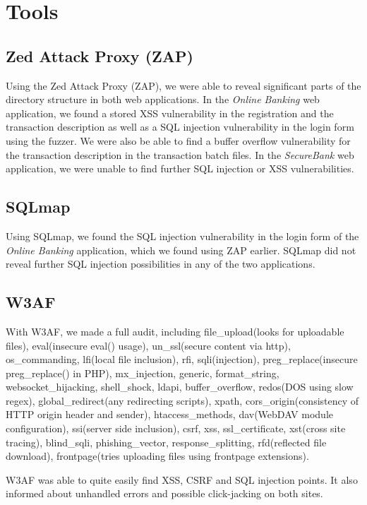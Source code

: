 \chapter{Tools}\label{chapter:tools}

\section{Zed Attack Proxy (ZAP)}
Using the Zed Attack Proxy (ZAP), we were able to reveal significant parts of the directory structure in both web applications. In the \textit{Online Banking} web application, we found a stored XSS vulnerability in the registration and the transaction description as well as a SQL injection vulnerability in the login form using the fuzzer. We were also be able to find a buffer overflow vulnerability for the transaction description in the transaction batch files. In the \textit{SecureBank} web application, we were unable to find further SQL injection or XSS vulnerabilities.

\section{SQLmap}
Using SQLmap, we found the SQL injection vulnerability in the login form of the \textit{Online Banking} application, which we found using ZAP earlier. SQLmap did not reveal further SQL injection possibilities in any of the two applications.

\section{W3AF}
With W3AF, we made a full audit, including file\_upload(looks for uploadable files), eval(insecure eval() usage), un\_ssl(secure content via http), os\_commanding, lfi(local file inclusion), rfi, sqli(injection), preg\_replace(insecure preg\_replace() in PHP), mx\_injection, generic, format\_string, websocket\_hijacking, shell\_shock, ldapi, buffer\_overflow, redos(DOS using slow regex), global\_redirect(any redirecting scripts), xpath, cors\_origin(consistency of HTTP origin header and sender), htaccess\_methods, dav(WebDAV module configuration), ssi(server side inclusion), csrf, xss, ssl\_certificate, xst(cross site tracing), blind\_sqli, phishing\_vector, response\_splitting, rfd(reflected file download), frontpage(tries uploading files using frontpage extensions).

W3AF was able to quite easily find XSS, CSRF and SQL injection points. It also informed about unhandled errors and possible click-jacking on both sites.

